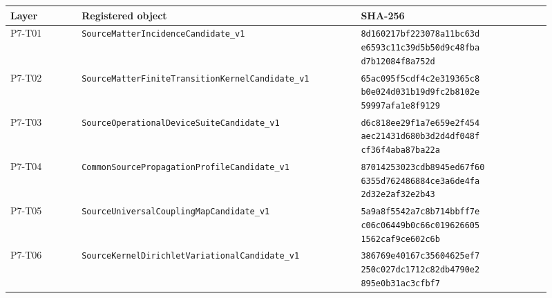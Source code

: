\documentclass[11pt]{article}
\begin{document}
\begin{longtable}{p{0.12\linewidth}p{0.47\linewidth}p{0.32\linewidth}}
\toprule
Layer & Registered object & SHA-256\\
\midrule
\endhead
P7-T01 &
\texttt{SourceMatterIncidence}\newline\texttt{Candidate\_v1} &
\texttt{\scriptsize 8d160217bf223078a11bc63d}\newline
\texttt{\scriptsize e6593c11c39d5b50d9c48fba}\newline
\texttt{\scriptsize d7b12084f8a752d}\\
P7-T02 &
\texttt{SourceMatterFiniteTransition}\newline\texttt{KernelCandidate\_v1} &
\texttt{\scriptsize 65ac095f5cdf4c2e319365c8}\newline
\texttt{\scriptsize b0e024d031b19d9fc2b8102e}\newline
\texttt{\scriptsize 59997afa1e8f9129}\\
P7-T03 &
\texttt{SourceOperationalDevice}\newline\texttt{SuiteCandidate\_v1} &
\texttt{\scriptsize d6c818ee29f1a7e659e2f454}\newline
\texttt{\scriptsize aec21431d680b3d2d4df048f}\newline
\texttt{\scriptsize cf36f4aba87ba22a}\\
P7-T04 &
\texttt{CommonSourcePropagation}\newline\texttt{ProfileCandidate\_v1} &
\texttt{\scriptsize 87014253023cdb8945ed67f60}\newline
\texttt{\scriptsize 6355d762486884ce3a6de4fa}\newline
\texttt{\scriptsize 2d32e2af32e2b43}\\
P7-T05 &
\texttt{SourceUniversalCouplingMap}\newline\texttt{Candidate\_v1} &
\texttt{\scriptsize 5a9a8f5542a7c8b714bbff7e}\newline
\texttt{\scriptsize c06c06449b0c66c019626605}\newline
\texttt{\scriptsize 1562caf9ce602c6b}\\
P7-T06 &
\texttt{SourceKernelDirichlet}\newline\texttt{VariationalCandidate\_v1} &
\texttt{\scriptsize 386769e40167c35604625ef7}\newline
\texttt{\scriptsize 250c027dc1712c82db4790e2}\newline
\texttt{\scriptsize 895e0b31ac3cfbf7}\\
\bottomrule
\end{longtable}
\end{document}
